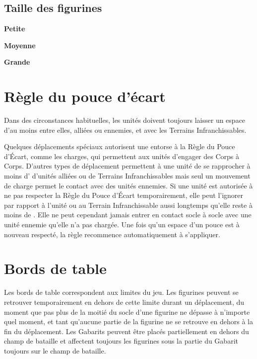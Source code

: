\subsection{Taille des figurines}
\label{modelheight}


\noindent\textbf{Petite}


\noindent\textbf{Moyenne}


\noindent\textbf{Grande}



\section{Règle du pouce d'écart}

Dans des circonstances habituelles, les unités doivent toujours laisser un espace d'au moins  entre elles, alliées ou ennemies, et avec les Terrains Infranchissables. 

Quelques déplacements spéciaux autorisent une entorse à la Règle du Pouce d'Écart, comme les charges, qui permettent aux unités d'engager des Corps à Corps. D'autres types de déplacement permettent à une unité de se rapprocher à moins d' d'unités alliées ou de Terrains Infranchissables mais seul un mouvement de charge permet le contact avec des unités ennemies. Si une unité est autorisée à ne pas respecter la Règle du Pouce d'Écart temporairement, elle peut l'ignorer par rapport à l'unité ou au Terrain Infranchissable aussi longtemps qu'elle reste à moins de . Elle ne peut cependant jamais entrer en contact socle à socle avec une unité ennemie qu'elle n'a pas chargée. Une fois qu'un espace d'un pouce est à nouveau respecté, la règle recommence automatiquement à s'appliquer.

\section{Bords de table}

Les bords de table correspondent aux limites du jeu. Les figurines peuvent se retrouver temporairement en dehors de cette limite durant un déplacement, du moment que pas plus de la moitié du socle d'une figurine ne dépasse à n'importe quel moment, et tant qu'aucune partie de la figurine ne se retrouve en dehors à la fin du déplacement. Les Gabarits peuvent être placés partiellement en dehors du champ de bataille et affectent toujours les figurines sous la partie du Gabarit toujours sur le champ de bataille.

